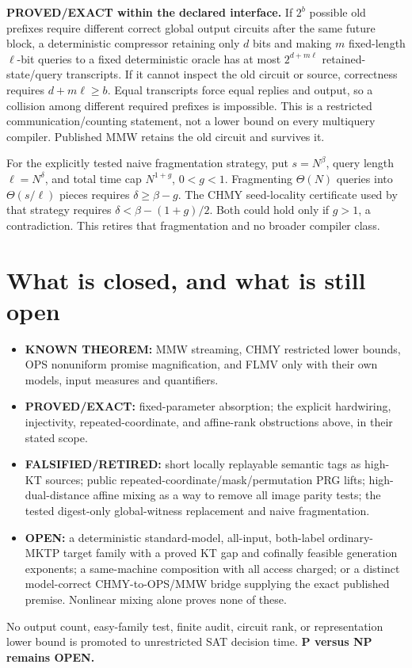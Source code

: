 \documentclass[11pt]{article}
\begin{document}
\textbf{PROVED/EXACT within the declared interface.}
If $2^b$ possible old prefixes require different correct global output
circuits after the same future block, a deterministic compressor retaining
only $d$ bits and making $m$ fixed-length $\ell$-bit queries to a fixed
deterministic oracle has at most $2^{d+m\ell}$ retained-state/query
transcripts. If it cannot inspect the old circuit or source, correctness
requires $d+m\ell\geq b$. Equal transcripts force equal replies and output,
so a collision among different required prefixes is impossible. This is a
restricted communication/counting statement, not a lower bound on every
multiquery compiler. Published MMW retains the old circuit and survives it.

For the explicitly tested naive fragmentation strategy, put
$s=N^\beta$, query length $\ell=N^\delta$, and total time cap
$N^{1+g}$, $0<g<1$. Fragmenting $\Theta(N)$ queries into
$\Theta(s/\ell)$ pieces requires $\delta\geq\beta-g$.
The CHMY seed-locality certificate used by that strategy requires
$\delta<\beta-(1+g)/2$. Both could hold only if $g>1$, a contradiction.
This retires that fragmentation and no broader compiler class.

\section{What is closed, and what is still open}

\begin{itemize}
\item \textbf{KNOWN THEOREM:} MMW streaming, CHMY restricted lower bounds,
OPS nonuniform promise magnification, and FLMV only with their own models,
input measures and quantifiers.
\item \textbf{PROVED/EXACT:} fixed-parameter absorption; the explicit
hardwiring, injectivity, repeated-coordinate, and affine-rank obstructions
above, in their stated scope.
\item \textbf{FALSIFIED/RETIRED:} short locally replayable semantic tags as
high-KT sources; public repeated-coordinate/mask/permutation PRG lifts;
high-dual-distance affine mixing as a way to remove all image parity tests;
the tested digest-only global-witness replacement and naive fragmentation.
\item \textbf{OPEN:} a deterministic standard-model, all-input, both-label
ordinary-MKTP target family with a proved KT gap and cofinally feasible
generation exponents; a same-machine composition with all access charged;
or a distinct model-correct CHMY-to-OPS/MMW bridge supplying the exact
published premise. Nonlinear mixing alone proves none of these.
\end{itemize}
No output count, easy-family test, finite audit, circuit rank, or
representation lower bound is promoted to unrestricted SAT decision time.
\textbf{P versus NP remains OPEN.}
\end{document}
